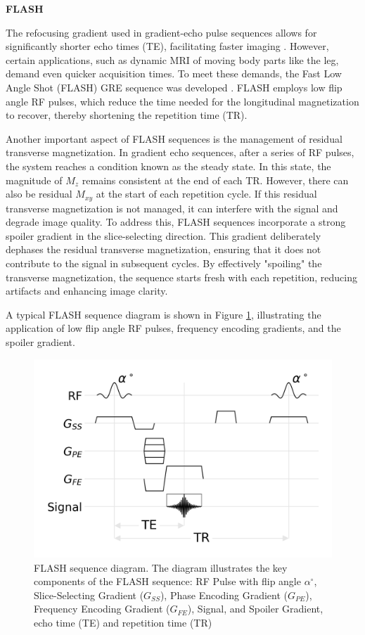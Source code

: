 \documentclass{micro-econ-thesis}
\begin{document}
\textbf{FLASH}

The refocusing gradient used in gradient-echo pulse sequences allows for significantly shorter echo times (TE), facilitating faster imaging \parencite[p.94]{westbrook_mri_2019}. However, certain applications, such as dynamic MRI of moving body parts like the leg, demand even quicker acquisition times. To meet these demands, the Fast Low Angle Shot (FLASH) GRE sequence was developed \parencite{haase_flash_1986}. FLASH employs low flip angle RF pulses, which reduce the time needed for the longitudinal magnetization to recover, thereby shortening the repetition time (TR). 

Another important aspect of FLASH sequences is the management of residual transverse magnetization. In gradient echo sequences, after a series of RF pulses, the system reaches a condition known as the steady state. In this state, the magnitude of $M_z$ remains consistent at the end of each TR. However, there can also be residual $M_{xy}$ at the start of each repetition cycle. If this residual transverse magnetization is not managed, it can interfere with the signal and degrade image quality. To address this, FLASH sequences incorporate a strong spoiler gradient in the slice-selecting direction. This gradient deliberately dephases the residual transverse magnetization, ensuring that it does not contribute to the signal in subsequent cycles. By effectively "spoiling" the transverse magnetization, the sequence starts fresh with each repetition, reducing artifacts and enhancing image clarity.

A typical FLASH sequence diagram is shown in Figure \ref{fig:gresimplified}, illustrating the application of low flip angle RF pulses, frequency encoding gradients, and the spoiler gradient.

\begin{figure}[H]
	\centering
	\includegraphics[width=0.7\linewidth]{flash_seq}
	\caption{FLASH sequence diagram. The diagram illustrates the key components of the FLASH sequence: RF Pulse with flip angle $\alpha^\circ$, Slice-Selecting Gradient ($G_{SS}$), Phase Encoding Gradient ($G_{PE}$), Frequency Encoding Gradient ($G_{FE}$), Signal, and Spoiler Gradient, echo time (TE) and repetition time (TR)}
	\label{fig:gresimplified}
\end{figure}
\end{document}
